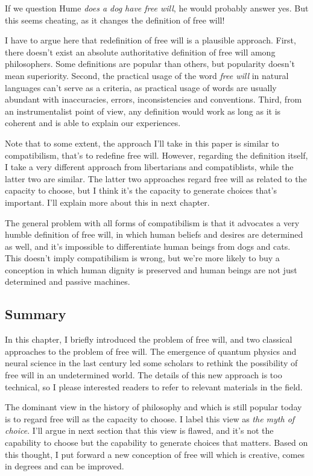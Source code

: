 If we question Hume \emph{does a dog have free will}, he would probably answer yes. But this seems cheating, as it changes the definition of free will!

I have to argue here that redefinition of free will is a plausible approach. First, there doesn't exist an absolute authoritative definition of free will among philosophers. Some definitions are popular than others, but popularity doesn't mean superiority. Second, the practical usage of the word \emph{free will} in natural languages can't serve as a criteria, as practical usage of words are usually abundant with inaccuracies,  errors, inconsistencies and conventions. Third, from an instrumentalist point of view, any definition would work as long as it is coherent and is able to explain our experiences.

Note that to some extent, the approach I'll take in this paper is similar to compatibilism, that's to redefine free will. However, regarding the definition itself, I take a very different approach from libertarians and compatiblists, while the latter two are similar. The latter two approaches regard free will as related to the capacity to choose, but I think it's the capacity to generate choices that's important. I'll explain more about this in next chapter.

The general problem with all forms of compatibilism is that it advocates a very humble definition of free will, in which human beliefs and desires are determined as well, and it's impossible to differentiate human beings from dogs and cats. This doesn't imply compatibilism is wrong, but we're more likely to buy a conception in which human dignity is preserved and human beings are not just determined and passive machines.

\subsection{Summary}

In this chapter, I briefly introduced the problem of free will, and two classical approaches to the problem of free will. The emergence of quantum physics and neural science in the last century led some scholars to rethink the possibility of free will in an undetermined world. The details of this new approach is too technical, so I please interested readers to refer to relevant materials in the field.

The dominant view in the history of philosophy and which is still popular today is to regard free will as the capacity to choose. I label this view as \emph{the myth of choice}. I'll argue in next section that this view is flawed, and it's not the capability to choose but the capability to generate choices that matters. Based on this thought, I put forward a new conception of free will which is creative, comes in degrees and can be improved.
